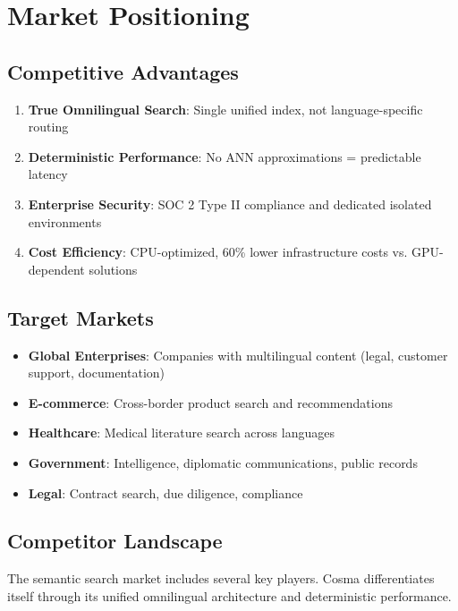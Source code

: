 \section{Market Positioning}

\subsection{Competitive Advantages}

\begin{enumerate}
    \item \textbf{True Omnilingual Search}: Single unified index, not language-specific routing
    \item \textbf{Deterministic Performance}: No ANN approximations = predictable latency
    \item \textbf{Enterprise Security}: SOC 2 Type II compliance and dedicated isolated environments
    \item \textbf{Cost Efficiency}: CPU-optimized, 60\% lower infrastructure costs vs. GPU-dependent solutions
\end{enumerate}

\subsection{Target Markets}

\begin{itemize}[noitemsep]
    \item \textbf{Global Enterprises}: Companies with multilingual content (legal, customer support, documentation)
    \item \textbf{E-commerce}: Cross-border product search and recommendations
    \item \textbf{Healthcare}: Medical literature search across languages
    \item \textbf{Government}: Intelligence, diplomatic communications, public records
    \item \textbf{Legal}: Contract search, due diligence, compliance
\end{itemize}

\subsection{Competitor Landscape}

The semantic search market includes several key players. Cosma differentiates itself through its unified omnilingual architecture and deterministic performance.

